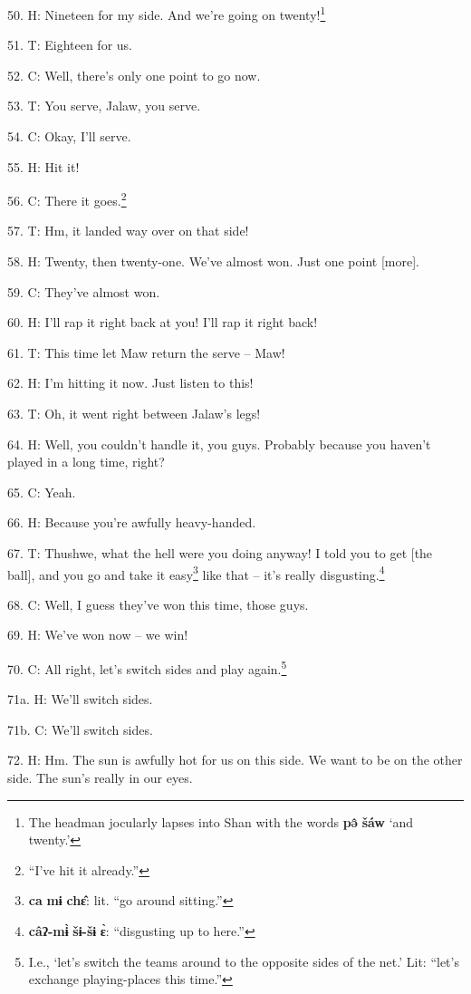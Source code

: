 50. H: Nineteen for my side. And we're going on twenty!\footnote{The headman jocularly lapses into Shan with the words \textbf{pə̂} \textbf{šáw} `and twenty.'}

51. T: Eighteen for us.

52. C: Well, there's only one point to go now.

53. T: You serve, Jalaw, you serve.

54. C: Okay, I'll serve.

55. H: Hit it!

56. C: There it goes.\footnote{``I've hit it already.''}

57. T: Hm, it landed way over on that side!

58. H: Twenty, then twenty-one. We've almost won. Just one point [more].

59. C: They've almost won.

60. H: I'll rap it right back at you! I'll rap it right back!

61. T: This time let Maw return the serve -- Maw!

62. H: I'm hitting it now. Just listen to this!


63. T: Oh, it went right between Jalaw's legs!

64. H: Well, you couldn't handle it, you guys. Probably because you haven't played
in a long time, right?

65. C: Yeah.

66. H: Because you're awfully heavy-handed.

67. T: Thushwe, what the hell were you doing anyway! I told you to get [the ball],
and you go and take it easy\footnote{\textbf{ca} \textbf{mɨ} \textbf{chɛ̂}: lit. ``go around sitting.''} like that -- it's really disgusting.\footnote{\textbf{câʔ-mɨ̀} \textbf{šɨ-šɨ} \textbf{ɛ̀}: ``disgusting up to here.''}

68. C: Well, I guess they've won this time, those guys.

69. H: We've won now -- we win!

70. C: All right, let's switch sides and play again.\footnote{I.e., `let's switch the teams around to the opposite sides of the net.' Lit: ``let's exchange playing-places this time.''}

71a. H: We'll switch sides.

71b. C: We'll switch sides.

72. H: Hm. The sun is awfully hot for us on this side. We want to be on the other
side. The sun's really in our eyes.

